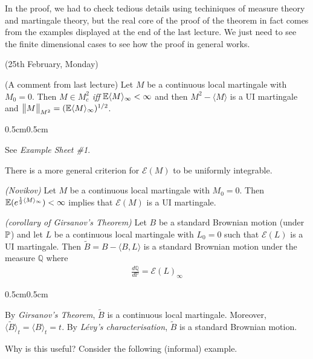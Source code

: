 \documentclass[12pt,a4paper]{article}
\newenvironment{proof}
{\begin{changemargin}{0.5cm}{0.5cm} 
	}%
	{\end{changemargin}
}
\newenvironment{p}
{\begin{proof} 
	}%
	{\end{proof}
}
\begin{document}
In the proof, we had to check tedious details using techiniques of measure theory and martingale theory, but the real core of the proof of the theorem in fact comes from the examples displayed at the end of the last lecture. We just need to see the finite dimensional cases to see how the proof in general works. 
\s

\newday

(25th February, Monday)
\s

(A comment from last lecture) \prop Let $M$ be a continuous local martingale with $M_0 =0$. Then $M \in M_c^2$ \emph{iff} $\mathbb{E} \langle M \rangle_{\infty} < \infty$ and then $M^2 - \langle M \rangle$ is a UI martingale and $\bigl\lVert M\bigr\rVert_{M^2} = (\mathbb{E} \langle M \rangle_{\infty})^{1/2}$.
\begin{p}
\pf See \emph{Example Sheet \#1}.
\end{p}
\s

There is a more general criterion for $\mathscr{E}(M)$ to be uniformly integrable.
\s

\thm \emph{(Novikov)} Let $M$ be a continuous local martingale with $M_0 = 0$. Then $\mathbb{E} (e^{\frac{1}{2} \langle M \rangle_{\infty}})< \infty$ implies that $\mathscr{E}(M)$ is a UI martingale.
\s

\corr \emph{(corollary of Girsanov's Theorem)} Let $B$ be a standard Brownian motion (under $\mathbb{P}$) and let $L$ be a continuous local martingale with $L_0 = 0$ such that $\mathscr{E}(L)$ is a UI martingale. Then $\tilde{B} = B- \langle B, L \rangle$ is a standard Brownian motion under the measure $\mathbb{Q}$ where
\begin{align*}
\frac{d\mathbb{Q}}{d\mathbb{P}} = \mathscr{E}(L)_{\infty}
\end{align*}
\begin{p}
\pf By \emph{Girsanov's Theorem}, $\tilde{B}$ is a continuous local martingale. Moreover, $\langle \tilde{B}\rangle_t = \langle B\rangle_t =t$. By \emph{L\'{e}vy's characterisation}, $\tilde{B}$ is a standard Brownian motion.

\eop
\end{p}
\s

Why is this useful? Consider the following (informal) example.
\s
\end{document}
